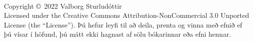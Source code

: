 \documentclass[11pt,fleqn]{book} %
\begin{document}

\begingroup
\thispagestyle{empty} %
\vfill
\endgroup


\newpage
~\vfill
\thispagestyle{empty}

\noindent Copyright \copyright\ 2022 Valborg Sturludóttir\\ %



\noindent Licensed under the Creative Commons Attribution-NonCommercial 3.0 Unported License (the ``License''). Þú hefur leyfi til að deila, prenta og vinna með efnið ef þú vísar í höfund, þú mátt ekki hagnast af sölu bókarinnar eða efni hennar.
\end{document}
